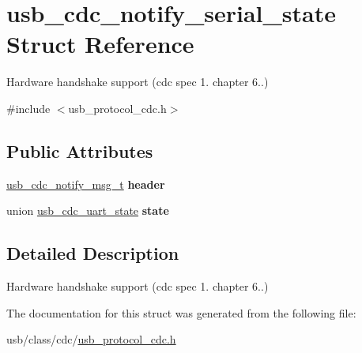\hypertarget{structusb__cdc__notify__serial__state}{}\section{usb\+\_\+cdc\+\_\+notify\+\_\+serial\+\_\+state Struct Reference}
\label{structusb__cdc__notify__serial__state}


Hardware handshake support (cdc spec 1. chapter 6..)  




{\ttfamily \#include $<$usb\+\_\+protocol\+\_\+cdc.\+h$>$}

\subsection*{Public Attributes}
\begin{DoxyCompactItemize}
\item 
\mbox{\label{structusb__cdc__notify__serial__state_ae33a8811f1264cb7f8f67cbffa933eda}} 
\hyperlink{structusb__cdc__notify__msg}{usb\+\_\+cdc\+\_\+notify\+\_\+msg\+\_\+t} {\bfseries header}
\item 
\mbox{\label{structusb__cdc__notify__serial__state_ac054155aa9d7b1c372155de0c1ed0fc5}} 
union \hyperlink{unionusb__cdc__uart__state}{usb\+\_\+cdc\+\_\+uart\+\_\+state} {\bfseries state}
\end{DoxyCompactItemize}


\subsection{Detailed Description}
Hardware handshake support (cdc spec 1. chapter 6..) 

The documentation for this struct was generated from the following file\+:\begin{DoxyCompactItemize}
\item 
usb/class/cdc/\hyperlink{usb__protocol__cdc_8h}{usb\+\_\+protocol\+\_\+cdc.\+h}\end{DoxyCompactItemize}
